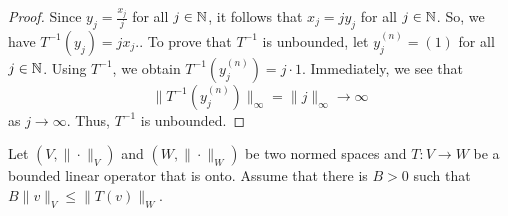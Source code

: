 \documentclass[a4paper]{article}
\begin{document}
\begin{enumerate}
        \begin{proof}
        Since \( {y}_{j} = \frac{ {x}_{j} }{ j }  \) for all \( j \in \mathbb{N} \), it follows that \( {x}_{j} = j {y}_{j} \) for all \( j \in \mathbb{N} \). So, we have \( T^{-1}({y}_{j}) = j {x}_{j}. \). To prove that \( T^{-1} \) is unbounded, let \( {y}_{j}^{(n)} = (1)  \) for all \( j \in \mathbb{N} \). Using \( T^{-1} \), we obtain \( T^{-1}({y}_{j}^{(n)}) = j \cdot 1  \). Immediately, we see that 
        \[  \|T^{-1}({y}_{j}^{(n)})\|_{\infty } = \|j\|_{\infty } \to \infty  \]
        as \( j \to \infty  \). Thus, \( T^{-1} \) is unbounded.
        \end{proof}
\end{enumerate}

\begin{problem}
    Let \( (V,\|\cdot\|_{V}) \) and \( (W, \|\cdot\|_{W}) \) be two normed spaces and \( T: V \to W  \) be a bounded linear operator that is onto. Assume that there is \( B > 0  \) such that \( B \|v\|_{V} \leq \|T(v)\|_{W} \).
\end{problem}
\end{document}
